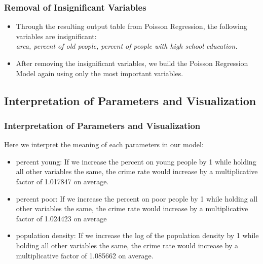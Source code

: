 \documentclass{beamer}
\begin{document}
\begin{frame}[fragile]
\frametitle{Removal of Insignificant Variables}

\begin{itemize}
\item Through the resulting output table from Poisson Regression, the following variables are insignificant:\\
\textsl{area, percent of old people, percent of people with high school education.}
\item After removing the insignificant variables, we build the Poisson Regression Model again using only the most important variables.
\end{itemize}
\end{frame}


\subsection{Interpretation of Parameters and Visualization}
\begin{frame}[fragile]
\frametitle{Interpretation of Parameters and Visualization}
Here we interpret the meaning of each parameters in our model:\\
\begin{itemize}
\item percent young:
If we increase the percent on young people by 1 while holding all other variables the same, the crime rate would increase by a multiplicative factor of 1.017847 on average.\\
\item percent poor: If we increase the percent on poor people by 1 while holding all other variables the same, the crime rate would increase by a multiplicative factor of 1.024423 on average\\
\item population density: If we increase the log of the population density by 1 while holding all other variables the same, the crime rate would increase by a multiplicative factor of 1.085662 on average.\\
\end{itemize}
\end{frame}
\end{document}
